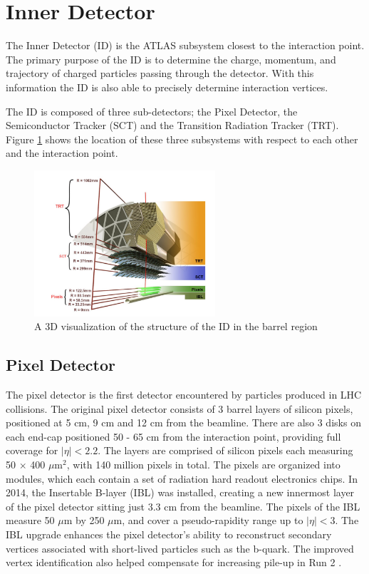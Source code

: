 \section{Inner Detector}

\indent The Inner Detector (ID) is the ATLAS subsystem closest to the interaction point. The primary purpose of the ID is to determine the charge, momentum, and trajectory of charged particles passing through the detector. With this information the ID is also able to precisely determine interaction vertices. \par

\indent The ID is composed of three sub-detectors; the Pixel Detector, the Semiconductor Tracker (SCT) and the Transition Radiation Tracker (TRT). Figure \ref{fig:innerDetector} shows the location of these three subsystems with respect to each other and the interaction point. \par

\begin{figure}
        \centering
	\includegraphics[width=0.6\textwidth]{figures/ch4/innerDetector.png}
	\caption{A 3D visualization of the structure of the ID in the barrel region \cite{innerDet}}
	\label{fig:innerDetector}
\end{figure}

\subsection{Pixel Detector}
The pixel detector is the first detector encountered by particles produced in LHC collisions. The original pixel detector consists of 3 barrel layers of silicon pixels, positioned at 5 cm, 9 cm and 12 cm from the beamline. There are also 3 disks on each end-cap positioned 50 - 65 cm from the interaction point, providing full coverage for $|\eta| < 2.2$. The layers are comprised of silicon pixels each measuring 50 $\times$ 400 $\mu$m$^2$, with 140 million pixels in total. The pixels are organized into modules, which each contain a set of radiation hard readout electronics chips. In 2014, the Insertable B-layer (IBL) was installed, creating a new innermost layer of the pixel detector sitting just 3.3 cm from the beamline. The pixels of the IBL measure 50 $\mu$m by 250 $\mu$m, and cover a pseudo-rapidity range up to $|\eta| < 3$. The IBL upgrade enhances the pixel detector's ability to reconstruct secondary vertices associated with short-lived particles such as the b-quark. The improved vertex identification also helped compensate for increasing pile-up in Run 2 \cite{atlas_overview}. 


